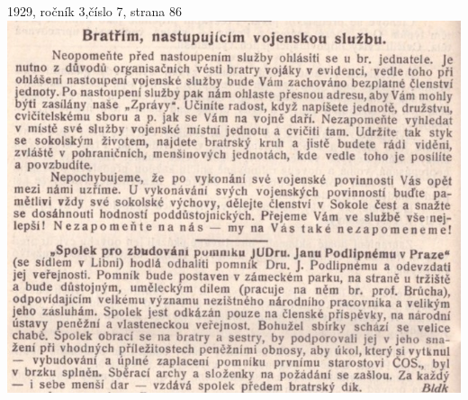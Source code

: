 \documentclass[11pt]{article}
\begin{document}
1929, ročník 3,číslo 7, strana 86 \\
\includegraphics[width=\imagewidth]{original/1929/Skener_20250318 (15).jpg}



\clearpage
\end{document}
